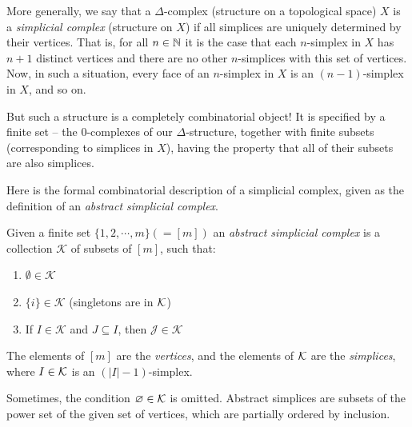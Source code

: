 \documentclass[11pt,a4paper]{report}
\begin{document}
	  More generally, we say that a $\Delta$-complex (structure on a topological space) $X$ is a \emph{simplicial complex} (structure on $X$) if all  simplices are
	  uniquely determined by their vertices. That is, for all $n\in \mathbb{N}$ it is the case that each $n$-simplex in $X$ has $n+1$ 
	  distinct vertices and there are no other $n$-simplices with this set of vertices. 
	  Now, in such a situation, every face of an $n$-simplex in $X$ is an $(n-1)$-simplex in $X$, and so on. 
	  
	  But 
	  such a structure is  a  completely combinatorial object! It is specified by a finite set -- the $0$-complexes of our $\Delta$-structure,
	  together with finite subsets (corresponding to simplices in $X$), having the property that all of their subsets are also simplices.
	  
	  
	  
	  
	   Here is the formal combinatorial description of a simplicial complex, given as the definition of an \emph{abstract simplicial complex}. 


		     
		     
		     \begin{defn}  
              Given a finite  set $  \{1, 2, \cdots, m\} (=[m])$ 
              an \emph{ abstract simplicial complex} is a collection $\mathcal{K}$ of subsets of $[m]$,  such that:
              \begin{enumerate}
              \item $\emptyset \in \mathcal{K}$
              \item $\{i\} \in \mathcal{K}$ (singletons are in $\mathcal{K}$)
              \item If $ I \in \mathcal{K} $ and $J\subseteq I$, then $\mathcal{J} \in \mathcal{K}$
              \end{enumerate}
              The elements of $[m]$ are the \emph{vertices}, and the elements of $\mathcal{K}$ are the \emph{simplices}, where $I\in \mathcal{K}$ is
              an $(|I|-1)$-simplex.
		     \end{defn}
		     Sometimes, the condition $\varnothing\in \mathcal{K}$ is omitted. Abstract simplices are subsets of the power set of the given set of vertices, 
		     which are partially ordered by inclusion.

            
             
\end{document}
